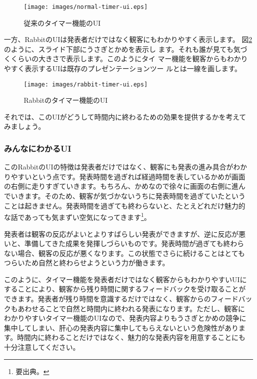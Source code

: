 \documentclass[mingoth,a4paper]{jsarticle}
\begin{document}
\begin{figure}[ht]
  \begin{center}
    \texttt{[image: images/normal-timer-ui.eps]}
  \end{center}
  \caption{従来のタイマー機能のUI}
  \label{fig:normal-timer-ui}
\end{figure}

一方、RabbitのUIは発表者だけではなく観客にもわかりやすく表示します。
図\ref{fig:rabbit-timer-ui}のように、スライド下部にうさぎとかめを表示し
ます。それも誰が見ても気づくくらいの大きさで表示します。このようにタイ
マー機能を観客からもわかりやすく表示するUIは既存のプレゼンテーションツー
ルとは一線を画します。

\begin{figure}[ht]
  \begin{center}
    \texttt{[image: images/rabbit-timer-ui.eps]}
  \end{center}
  \caption{Rabbitのタイマー機能のUI}
  \label{fig:rabbit-timer-ui}
\end{figure}

それでは、このUIがどうして時間内に終わるための効果を提供するかを考えて
みましょう。

\subsubsection{みんなにわかるUI}

このRabbitのUIの特徴は発表者だけではなく、観客にも発表の進み具合がわか
りやすいという点です。発表時間を過ぎれば経過時間を表しているかめが画面
の右側に走りすぎていきます。もちろん、かめなので徐々に画面の右側に進ん
でいきます。そのため、観客が気づかないうちに発表時間を過ぎていたという
ことは起きません。発表時間を過ぎても終わらないと、たとえどれだけ魅力的
な話であっても気まずい空気になってきます\footnote{要出典。}。

発表者は観客の反応がよいとよりすばらしい発表ができますが、逆に反応が悪
いと、準備してきた成果を発揮しづらいものです。発表時間が過ぎても終わら
ない場合、観客の反応が悪くなります。この状態でさらに続けることはとても
つらいため自然と終わらせようという力が働きます。

このように、タイマー機能を発表者だけではなく観客からもわかりやすいUIに
することにより、観客から残り時間に関するフィードバックを受け取ることが
できます。発表者が残り時間を意識するだけではなく、観客からのフィードバッ
クもあわせることで自然と時間内に終われる発表になります。ただし、観客に
わかりやすいタイマー機能のUIなので、発表内容よりもうさぎとかめの競争に
集中してしまい、肝心の発表内容に集中してもらえないという危険性がありま
す。時間内に終わることだけではなく、魅力的な発表内容を用意することにも
十分注意してください。
\end{document}
